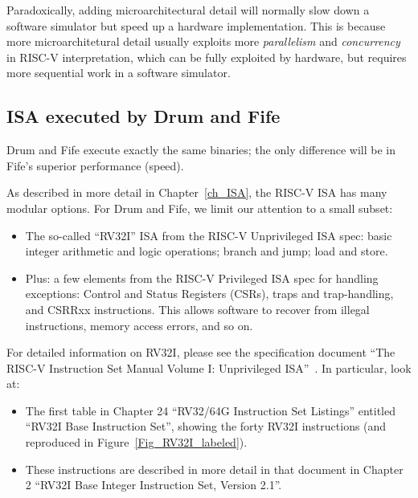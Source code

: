 Paradoxically, adding microarchitectural detail will normally slow
down a software simulator but speed up a hardware implementation.
This is because more microarchitetural detail usually exploits more
\emph{parallelism} and \emph{concurrency} in RISC-V interpretation,
which can be fully exploited by hardware, but requires more sequential
work in a software simulator.


\subsection{ISA executed by Drum and Fife}

Drum and Fife execute exactly the same binaries; the only difference
will be in Fife's superior performance (speed).

As described in more detail in Chapter~\ref{ch_ISA}, the RISC-V ISA
has many modular options.  For Drum and Fife, we limit our attention
to a small subset:

\begin{itemize}
		  
 \item The so-called ``RV32I'' ISA from the RISC-V Unprivileged ISA
       spec: basic integer arithmetic and logic operations; branch and
       jump; load and store.

 \item Plus: a few elements from the RISC-V Privileged ISA spec for
       handling exceptions: Control and Status Registers (CSRs), traps
       and trap-handling, and CSRRxx instructions.  This allows
       software to recover from illegal instructions, memory access
       errors, and so on.

\end{itemize}

For detailed information on RV32I, please see the specification
document ``The RISC-V Instruction Set Manual Volume I: Unprivileged
ISA''~\cite{RISCV_Unpriv_2019_12_13}.  In particular, look at:

\begin{itemize}

 \item The first table in Chapter 24 ``RV32/64G Instruction Set
       Listings'' entitled ``RV32I Base Instruction Set'', showing the
       forty RV32I instructions (and reproduced in
       Figure~\ref{Fig_RV32I_labeled}).

 \item These instructions are described in more detail in that
       document in Chapter 2 ``RV32I Base Integer Instruction Set,
       Version 2.1''.

\end{itemize}

